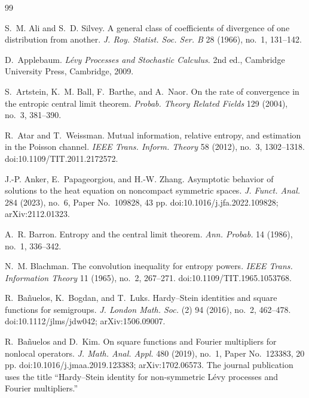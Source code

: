 \begin{thebibliography}{99}

S.~M. Ali and S.~D. Silvey.
\newblock A general class of coefficients of divergence of one distribution
from another.
\newblock \emph{J. Roy. Statist. Soc. Ser. B} 28 (1966), no.~1, 131--142.

D.~Applebaum.
\newblock \emph{L{\'e}vy Processes and Stochastic Calculus}.
\newblock 2nd ed., Cambridge University Press, Cambridge, 2009.

S.~Artstein, K.~M. Ball, F.~Barthe, and A.~Naor.
\newblock On the rate of convergence in the entropic central limit theorem.
\newblock \emph{Probab. Theory Related Fields} 129 (2004), no.~3, 381--390.

R.~Atar and T.~Weissman.
\newblock Mutual information, relative entropy, and estimation in the Poisson
channel.
\newblock \emph{IEEE Trans. Inform. Theory} 58 (2012), no.~3, 1302--1318.
\newblock doi:10.1109/TIT.2011.2172572.

J.-P. Anker, E.~Papageorgiou, and H.-W. Zhang.
\newblock Asymptotic behavior of solutions to the heat equation on noncompact
symmetric spaces.
\newblock \emph{J. Funct. Anal.} 284 (2023), no.~6, Paper No.~109828,
43 pp.
\newblock doi:10.1016/j.jfa.2022.109828; arXiv:2112.01323.

A.~R. Barron.
\newblock Entropy and the central limit theorem.
\newblock \emph{Ann. Probab.} 14 (1986), no.~1, 336--342.

N.~M. Blachman.
\newblock The convolution inequality for entropy powers.
\newblock \emph{IEEE Trans. Information Theory} 11 (1965), no.~2, 267--271.
\newblock doi:10.1109/TIT.1965.1053768.

R.~Ba{\~n}uelos, K.~Bogdan, and T.~Luks.
\newblock Hardy--Stein identities and square functions for semigroups.
\newblock \emph{J. London Math. Soc.} (2) 94 (2016), no.~2, 462--478.
\newblock doi:10.1112/jlms/jdw042; arXiv:1506.09007.

R.~Ba{\~n}uelos and D.~Kim.
\newblock On square functions and Fourier multipliers for nonlocal operators.
\newblock \emph{J. Math. Anal. Appl.} 480 (2019), no.~1, Paper No.~123383,
20 pp.
\newblock doi:10.1016/j.jmaa.2019.123383; arXiv:1702.06573.
\newblock The journal publication uses the title ``Hardy--Stein identity for
non-symmetric L{\'e}vy processes and Fourier multipliers.''


\end{thebibliography}
